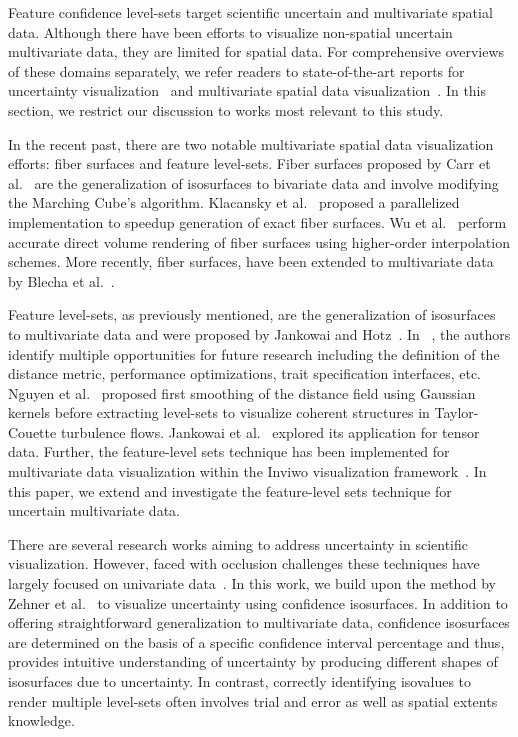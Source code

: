 Feature confidence level-sets target scientific uncertain and multivariate spatial data.
Although there have been efforts to visualize non-spatial uncertain multivariate data, they are limited for spatial data.
For comprehensive overviews of these domains separately, we refer readers to state-of-the-art reports for uncertainty visualization~\cite{Bonneau2014} and multivariate spatial data visualization~\cite{he2019multivariate}.
In this section, we restrict our discussion to works most relevant to this study.


In the recent past, there are two notable multivariate spatial data visualization efforts: fiber surfaces and feature level-sets.
%
Fiber surfaces proposed by Carr et al.~\cite{carr2015fiber} are the generalization of isosurfaces to bivariate data and involve modifying the Marching Cube's algorithm.
%
Klacansky et al.~\cite{klacansky2016fast} proposed a parallelized implementation to speedup generation of exact fiber surfaces.
%
Wu et al.~\cite{wu2016direct} perform accurate direct volume rendering of fiber surfaces using higher-order interpolation schemes.
%
More recently, fiber surfaces, have been extended to multivariate data by Blecha et al.~\cite{blecha2020fiber}.
%

Feature level-sets, as previously mentioned, are the generalization of isosurfaces to multivariate data and were proposed by Jankowai and Hotz~\cite{jankowai2020feature}.
%
In ~\cite{jankowai2020feature}, the authors identify multiple opportunities for future research including the definition of the distance metric, performance optimizations, trait specification interfaces, etc.
%
Nguyen et al.~\cite{nguyen2020visualization} proposed first smoothing of the distance field using Gaussian kernels before extracting level-sets to visualize coherent structures in Taylor-Couette turbulence flows.
%
Jankowai et al.~\cite{jankowai2020tensor} explored its application for tensor data. 
%
Further, the feature-level sets technique has been implemented for multivariate data visualization within the Inviwo visualization framework~\cite{jonsson2020inviwo}. 
%
In this paper, we extend and investigate the feature-level sets technique for uncertain multivariate data. 

There are several research works aiming to address uncertainty in scientific visualization.
%
However, faced with occlusion challenges these techniques have largely focused on univariate data~\cite{}.
%
In this work, we build upon the method by Zehner et al.~\cite{zehner2010visualization} to visualize uncertainty using confidence isosurfaces.
%
In addition to offering straightforward generalization to multivariate data, confidence isosurfaces are determined on the basis of a specific confidence interval percentage and thus, provides intuitive understanding of uncertainty by producing different shapes of isosurfaces due to uncertainty. 
%
In contrast, correctly identifying isovalues to render multiple level-sets often involves trial and error as well as spatial extents knowledge. 


